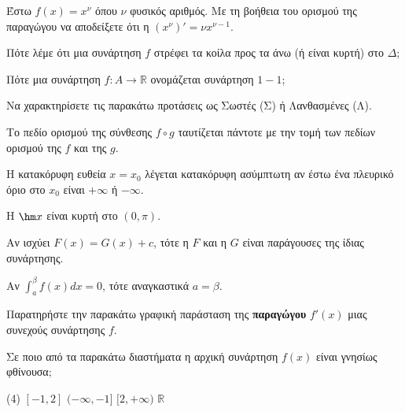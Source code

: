 \documentclass[11pt,a4paper]{article}
\newcommand{\kerkissans}[1]{{\fontfamily{maksf}\selectfont \textbf{#1}}}
\renewcommand{\textdexiakeraia}{}
\newcommand{\dint}{\displaystyle\int}
\newcommand\themanum{A}
\newcounter{thema}[section]
\renewcommand{\thethema}{\arabic{thema}}
\newcommand{\Thema}{\refstepcounter{thema}{\textbf{\textcolor{black}{\faPenSquare\ \  \large \kerkissans{\textbf{\thethemaο\hspace{2mm}Διαγώνισμα - Θέμα \themanum}}}}}\hspace{0mm}}{}
\newenvironment{thema}[1]
{\begin{tcolorbox}[title=\Thema\kerkissans{\textbf{\large{  #1}}},breakable,
enhanced standard,titlerule=0pt,toprule=0pt, rightrule=0pt, bottomrule=0pt,
colback=white,left=0mm,top=1mm,bottom=0mm,
boxrule=0pt,
colframe=white,leftrule=0mm,sharp corners,coltitle=black]
\renewcommand{\themanum}{#1}}
{\end{tcolorbox}}
\begin{document}
\begin{thema}{A}
\begin{erwthma}
    \item Έστω $f(x) = x^\nu$ όπου $\nu$ φυσικός αριθμός. Με τη βοήθεια του ορισμού της παραγώγου να αποδείξετε ότι η $(x^\nu)' = \nu x^{\nu - 1}$.
    \item Πότε λέμε ότι μια συνάρτηση $f$ στρέφει τα κοίλα προς τα άνω (ή είναι κυρτή) στο $\Delta$;
    \item Πότε μια συνάρτηση $f:A\to\mathbb{R}$ ονομάζεται συνάρτηση $1-1$;
    \item Να χαρακτηρίσετε τις παρακάτω προτάσεις ως Σωστές (Σ) ή Λανθασμένες (Λ).
    \begin{alist}
        \item Το πεδίο ορισμού της σύνθεσης $f \circ g$ ταυτίζεται πάντοτε με την τομή των πεδίων ορισμού της $f$ και της $g$.
        \item Η κατακόρυφη ευθεία $x=x_0$ λέγεται κατακόρυφη ασύμπτωτη αν έστω ένα πλευρικό όριο στο $x_0$ είναι $+\infty$ ή $-\infty$.
        \item Η $\hm x$ είναι κυρτή στο $(0, \pi)$.
        \item Αν ισχύει $F(x) = G(x) + c$, τότε η $F$ και η $G$ είναι παράγουσες της ίδιας συνάρτησης.
        \item Αν $\dint_a^\beta f(x)dx = 0$, τότε αναγκαστικά $a = \beta$.
    \end{alist}
    \item Παρατηρήστε την παρακάτω γραφική παράσταση της \textbf{παραγώγου} $f'(x)$ μιας συνεχούς συνάρτησης $f$.
    \begin{center}
    \end{center}
    Σε ποιο από τα παρακάτω διαστήματα η αρχική συνάρτηση $f(x)$ είναι γνησίως φθίνουσα;
    \begin{tasks}[label=\let\textdexiakeraia\relax\alph*.](4)
        \task $[ -1, 2 ]$
        \task $(-\infty, -1]$
        \task $[2, +\infty)$
        \task $\mathbb{R}$
    \end{tasks}
\end{erwthma}
\end{thema}
\vspace{1cm}
\end{document}
